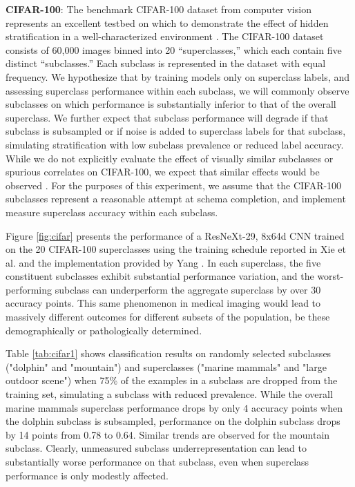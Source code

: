 \documentclass{article}
\begin{document}
\textbf{CIFAR-100}: The benchmark CIFAR-100 dataset from computer vision represents an excellent testbed on which to demonstrate the effect of hidden stratification in a well-characterized environment \citep{Krizhevsky2009-tq}.  
The CIFAR-100 dataset consists of 60,000 images binned into 20 ``superclasses,'' which each contain five distinct ``subclasses.'' 
 Each subclass is represented in the dataset with equal frequency.  
 We hypothesize that by training models only on superclass labels, and assessing superclass performance within each subclass, we will commonly observe subclasses on which performance is substantially inferior to that of the overall superclass.  
  We further expect that subclass performance will degrade if that subclass is subsampled or if noise is added to superclass labels for that subclass, simulating stratification with low subclass prevalence or reduced label accuracy.
 While we do not explicitly evaluate the effect of visually similar subclasses or spurious correlates on CIFAR-100, we expect that similar effects would be observed \citep{Selbst2017-gz}.  
 For the purposes of this experiment, we assume that the CIFAR-100 subclasses represent a reasonable attempt at schema completion, and implement measure superclass accuracy within each subclass.
 
 Figure \ref{fig:cifar} presents the performance of a ResNeXt-29, 8x64d CNN trained on the 20 CIFAR-100 superclasses using the training schedule reported in Xie et al. \citep{Xie2016-ip} and the implementation provided by Yang \citep{Yang_undated-bt}.  
In each superclass, the five constituent subclasses exhibit substantial performance variation, and the worst-performing subclass can underperform the aggregate superclass by over 30 accuracy points.  
This same phenomenon in medical imaging would lead to massively different outcomes for different subsets of the population, be these demographically or pathologically determined. 

 Table \ref{tab:cifar1} shows classification results on randomly selected subclasses ("dolphin" and "mountain") and superclasses ("marine mammals" and "large outdoor scene") when 75\% of the examples in a subclass are dropped from the training set, simulating a subclass with reduced prevalence.  
 While the overall marine mammals superclass performance drops by only 4 accuracy points when the dolphin subclass is subsampled, performance on the dolphin subclass drops by 14 points from 0.78 to 0.64.  
 Similar trends are observed for the mountain subclass.  
 Clearly, unmeasured subclass underrepresentation can lead to substantially worse performance on that subclass, even when superclass performance is only modestly affected.
 
\end{document}
